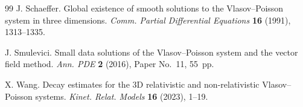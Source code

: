 \documentclass[reqno,11pt]{amsart}
\numberwithin{equation}{section}
\begin{document}
\begin{thebibliography}{99}
	J. Schaeffer. Global existence of smooth solutions to the Vlasov--Poisson system in three dimensions.
	\emph{Comm. Partial Differential Equations} \textbf{16} (1991), 1313--1335.
	
	J. Smulevici. Small data solutions of the Vlasov--Poisson system and the vector field method.
	\emph{Ann. PDE} \textbf{2} (2016), Paper No.~11, 55~pp.
	
	X. Wang. Decay estimates for the 3D relativistic and non-relativistic Vlasov--Poisson systems.
	\emph{Kinet. Relat. Models} \textbf{16} (2023), 1--19.
	
\end{thebibliography}
\end{document}
